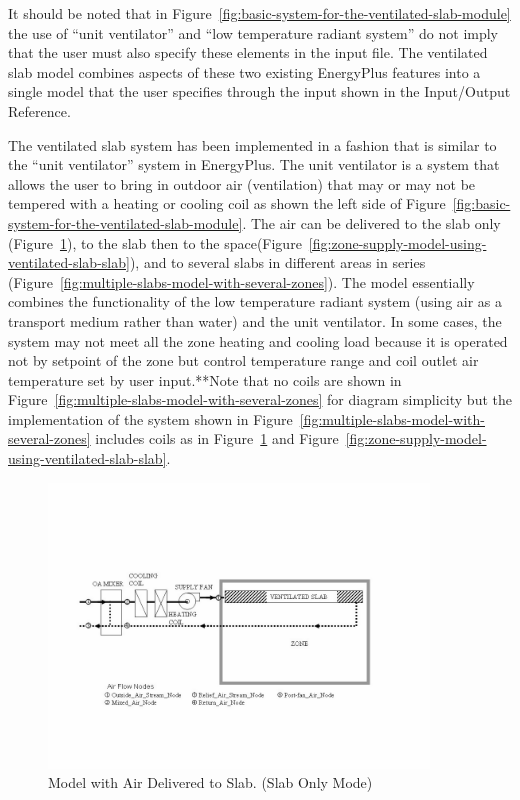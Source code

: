 It should be noted that in Figure~\ref{fig:basic-system-for-the-ventilated-slab-module} the use of ``unit ventilator'' and ``low temperature radiant system'' do not imply that the user must also specify these elements in the input file. The ventilated slab model combines aspects of these two existing EnergyPlus features into a single model that the user specifies through the input shown in the Input/Output Reference.

The ventilated slab system has been implemented in a fashion that is similar to the ``unit ventilator'' system in EnergyPlus. The unit ventilator is a system that allows the user to bring in outdoor air (ventilation) that may or may not be tempered with a heating or cooling coil as shown the left side of Figure~\ref{fig:basic-system-for-the-ventilated-slab-module}. The air can be delivered to the slab only (Figure~\ref{fig:model-with-air-delivered-to-slab.-slab-only}), to the slab then to the space(Figure~\ref{fig:zone-supply-model-using-ventilated-slab-slab}), and to several slabs in different areas in series (Figure~\ref{fig:multiple-slabs-model-with-several-zones}). The model essentially combines the functionality of the low temperature radiant system (using air as a transport medium rather than water) and the unit ventilator. In some cases, the system may not meet all the zone heating and cooling load because it is operated not by setpoint of the zone but control temperature range and coil outlet air temperature set by user input.**Note that no coils are shown in Figure~\ref{fig:multiple-slabs-model-with-several-zones} for diagram simplicity but the implementation of the system shown in Figure~\ref{fig:multiple-slabs-model-with-several-zones} includes coils as in Figure~\ref{fig:model-with-air-delivered-to-slab.-slab-only} and Figure~\ref{fig:zone-supply-model-using-ventilated-slab-slab}.

\begin{figure}[hbtp] %
\centering
\includegraphics[width=0.9\textwidth, height=0.9\textheight, keepaspectratio=true]{media/image7397.png}
\caption{Model with Air Delivered to Slab. (Slab Only Mode) \protect \label{fig:model-with-air-delivered-to-slab.-slab-only}}
\end{figure}

